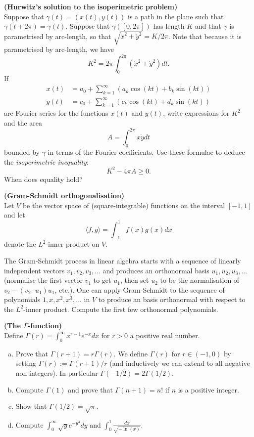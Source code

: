 \documentclass[12pt]{article}
\begin{document}
\newpage

\begin{question}{\bf (Hurwitz's solution to the isoperimetric problem)}\\
Suppose that $\gamma(t)=(x(t),y(t))$ is a path in the plane such that $\gamma(t+2\pi)=\gamma(t)$. Suppose that $\gamma([0,2\pi])$ has length $K$ and that $\gamma$ is parametrised by arc-length, so that $\sqrt{\dot{x}^2+\dot{y}^2}=K/2\pi$. Note that because it is parametrised by arc-length, we have
\[K^2=2\pi\int_0^{2\pi}\left(\dot{x}^2+\dot{y}^2\right)dt.\]
If
\begin{align*}
x(t)&=a_0+\sum_{k=1}^{\infty}\left(a_k\cos(kt)+b_k\sin(kt)\right)\\
y(t)&=c_0+\sum_{k=1}^{\infty}\left(c_k\cos(kt)+d_k\sin(kt)\right)
\end{align*}
are Fourier series for the functions $x(t)$ and $y(t)$, write expressions for $K^2$ and the area
\[A=\int_0^{2\pi}x\dot{y}dt\]
bounded by $\gamma$ in terms of the Fourier coefficients. Use these formulae to deduce the {\em isoperimetric inequality}:
\[K^2-4\pi A\geq 0.\]
When does equality hold?
\end{question}

\bigskip

\begin{question}{\bf (Gram-Schmidt orthogonalisation)}\\
Let $V$ be the vector space of (square-integrable) functions on the interval $[-1,1]$ and let
\[\langle f,g\rangle=\int_{-1}^1f(x)g(x)dx\]
denote the $L^2$-inner product on $V$.

The Gram-Schmidt process in linear algebra starts with a sequence of linearly independent vectors $v_1,v_2,v_3,\ldots$ and produces an orthonormal basis $u_1,u_2,u_3,\ldots$ (normalise the first vector $v_1$ to get $u_1$, then set $u_2$ to be the normalisation of $v_2-(v_2\cdot u_1)u_1$, etc.). One can apply Gram-Schmidt to the sequence of polynomials $1,x,x^2,x^3,\ldots$ in $V$ to produce an basis orthonormal with respect to the $L^2$-inner product. Compute the first few orthonormal polynomials.
\end{question}

\newpage

\begin{question}{\bf (The $\Gamma$-function)}\\
Define $\Gamma(r)=\int_0^{\infty}x^{r-1}e^{-x}dx$ for $r>0$ a positive real number.
\begin{enumerate}[(a)]
\item Prove that $\Gamma(r+1)=r\Gamma(r)$.  We define $\Gamma(r)$ for $r\in(-1,0)$ by setting $\Gamma(r):=\Gamma(r+1)/r$ (and inductively we can extend to all negative non-integers). In particular $\Gamma(-1/2)=2\Gamma(1/2)$.
\item Compute $\Gamma(1)$ and prove that $\Gamma(n+1)=n!$ if $n$ is a positive integer.
\item Show that $\Gamma(1/2)=\sqrt{\pi}$.
\item Compute $\int_0^{\infty}\sqrt{y}e^{-y^3}dy$ and $\int_0^1\frac{dx}{\sqrt{-\ln(x)}}$.
\end{enumerate}
\end{question}
\end{document}
